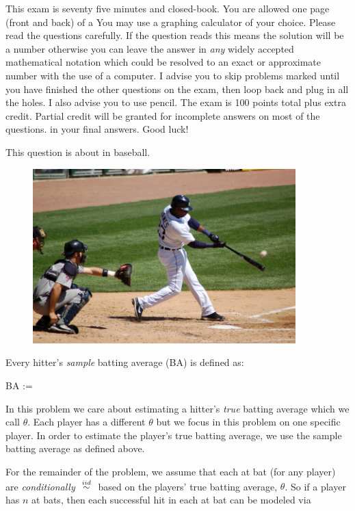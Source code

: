 \documentclass[12pt]{article}
\begin{document}
This exam is seventy five minutes and closed-book. You are allowed one page (front and back) of a  You may use a graphing calculator of your choice. Please read the questions carefully. If the question reads  this means the solution will be a number otherwise you can leave the answer in \textit{any} widely accepted mathematical notation which could be resolved to an exact or approximate number with the use of a computer. I advise you to skip problems marked  until you have finished the other questions on the exam, then loop back and plug in all the holes. I also advise you to use pencil. The exam is 100 points total plus extra credit. Partial credit will be granted for incomplete answers on most of the questions.  in your final answers. Good luck!

\pagebreak


\problem This question is about  in baseball.

\begin{figure}[htp]
\centering
\includegraphics[width=4in]{baseball.jpg}
\end{figure}

\noindent Every hitter's \emph{sample} batting average (BA) is defined as:

\beqn
BA := 
\eeqn

In this problem we care about estimating a hitter's \emph{true} batting average which we call $\theta$. Each player has a different $\theta$ but we focus in this problem on one specific player. In order to estimate the player's true batting average, we use the sample batting average as defined above. 

\benum
{} For the remainder of the problem, we assume that each at bat (for any player) are \emph{conditionally} $\iid$ based on the players' true batting average, $\theta$. So if a player has $n$ at bats, then each successful hit in each at bat can be modeled via
\end{document}
